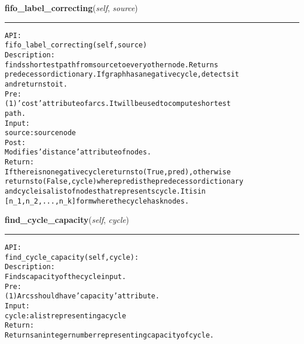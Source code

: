     \label{coinor:gimpy:graph:Graph:fifo_label_correcting}

    \vspace{0.5ex}

\hspace{.8\funcindent}\begin{boxedminipage}{\funcwidth}

    \raggedright \textbf{fifo\_label\_correcting}(\textit{self}, \textit{source})

    \vspace{-1.5ex}

    \rule{\textwidth}{0.5\fboxrule}
\setlength{\parskip}{2ex}
\begin{alltt}

API:
    fifo\_label\_correcting(self, source)
Description:
    finds shortest path from source to every other node. Returns
    predecessor dictionary. If graph has a negative cycle, detects it
    and returns to it.
Pre:
    (1) 'cost' attribute of arcs. It will be used to compute shortest
    path.
Input:
    source: source node
Post:
    Modifies 'distance' attribute of nodes.
Return:
    If there is no negative cycle returns to (True, pred), otherwise
    returns to (False, cycle) where pred is the predecessor dictionary
    and cycle is a list of nodes that represents cycle. It is in
    [n\_1, n\_2, ..., n\_k] form where the cycle has k nodes.
\end{alltt}

\setlength{\parskip}{1ex}
    \end{boxedminipage}

    \label{coinor:gimpy:graph:Graph:find_cycle_capacity}

    \vspace{0.5ex}

\hspace{.8\funcindent}\begin{boxedminipage}{\funcwidth}

    \raggedright \textbf{find\_cycle\_capacity}(\textit{self}, \textit{cycle})

    \vspace{-1.5ex}

    \rule{\textwidth}{0.5\fboxrule}
\setlength{\parskip}{2ex}
\begin{alltt}

API:
    find\_cycle\_capacity(self, cycle):
Description:
    Finds capacity of the cycle input.
Pre:
    (1) Arcs should have 'capacity' attribute.
Input:
    cycle: a list representing a cycle
Return:
    Returns an integer number representing capacity of cycle.
\end{alltt}

\setlength{\parskip}{1ex}
    \end{boxedminipage}

